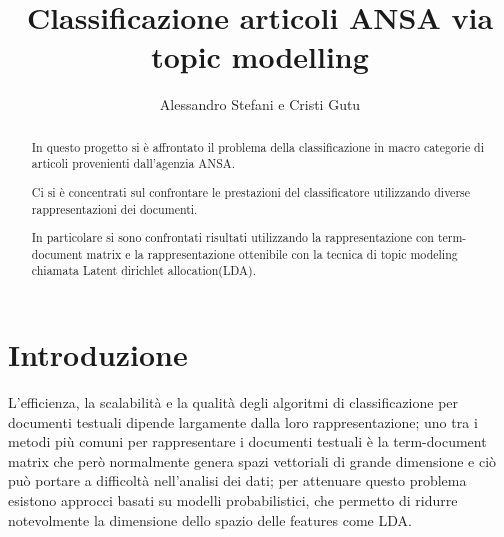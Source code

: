 \documentclass[runningheads]{llncs}
\begin{document}
%
\title{Classificazione articoli ANSA via topic modelling}
%
%
\author{%
  Alessandro Stefani e
  Cristi Gutu}
%
%
%
\maketitle
%
\begin{abstract}
In questo progetto si \`e affrontato il problema della classificazione in macro categorie di articoli provenienti dall'agenzia ANSA.

Ci si \`e concentrati sul confrontare le prestazioni del classificatore utilizzando diverse rappresentazioni dei documenti.

In particolare si sono confrontati risultati utilizzando la rappresentazione con term-document matrix e la rappresentazione ottenibile con la tecnica di topic modeling chiamata Latent dirichlet allocation(LDA)\cite{LDA}.

\end{abstract}


\section{Introduzione}
\label{sec:introduzione}
L'efficienza, la scalabilit\`a e la qualit\`a degli algoritmi di classificazione per documenti testuali dipende largamente dalla loro rappresentazione; uno tra i metodi pi\`u comuni per rappresentare i documenti testuali \`e la term-document matrix che per\`o normalmente genera spazi vettoriali di grande dimensione e ci\`o pu\`o portare a difficolt\`a nell'analisi dei dati; per attenuare questo problema esistono approcci basati su modelli probabilistici, che permetto di ridurre notevolmente la dimensione dello spazio delle features come LDA.
\end{document}

